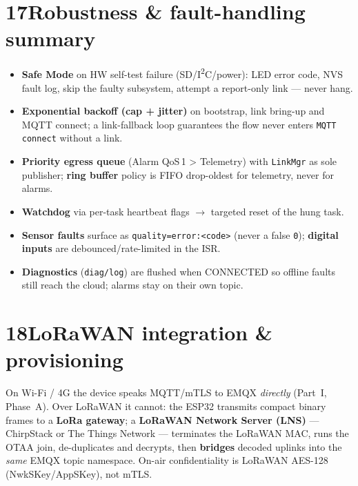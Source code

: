 \section*{17\quad Robustness \& fault-handling summary}
\begin{itemize}[leftmargin=1.4em,itemsep=1pt]
  \item \textbf{Safe Mode} on HW self-test failure (SD/I\textsuperscript{2}C/power): LED error code, NVS fault log,
        skip the faulty subsystem, attempt a report-only link — never hang.
  \item \textbf{Exponential backoff (cap + jitter)} on bootstrap, link bring-up and MQTT connect;
        a link-fallback loop guarantees the flow never enters \texttt{MQTT connect} without a link.
  \item \textbf{Priority egress queue} (Alarm QoS\,1 > Telemetry) with \texttt{LinkMgr} as sole
        publisher; \textbf{ring buffer} policy is FIFO drop-oldest for telemetry, never for alarms.
  \item \textbf{Watchdog} via per-task heartbeat flags $\to$ targeted reset of the hung task.
  \item \textbf{Sensor faults} surface as \texttt{quality=error:<code>} (never a false \texttt{0});
        \textbf{digital inputs} are debounced/rate-limited in the ISR.
  \item \textbf{Diagnostics} (\texttt{diag/log}) are flushed when CONNECTED so offline faults still
        reach the cloud; alarms stay on their own topic.
\end{itemize}

\newpage
\section*{18\quad LoRaWAN integration \& provisioning}
On Wi-Fi / 4G the device speaks MQTT/mTLS to EMQX \emph{directly} (Part~I, Phase~A). Over LoRaWAN
it cannot: the ESP32 transmits compact binary frames to a \textbf{LoRa gateway}; a
\textbf{LoRaWAN Network Server (LNS)} — ChirpStack or The Things Network — terminates the LoRaWAN
MAC, runs the OTAA join, de-duplicates and decrypts, then \textbf{bridges} decoded uplinks into the
\emph{same} EMQX topic namespace. On-air confidentiality is LoRaWAN AES-128 (NwkSKey/AppSKey), not mTLS.

